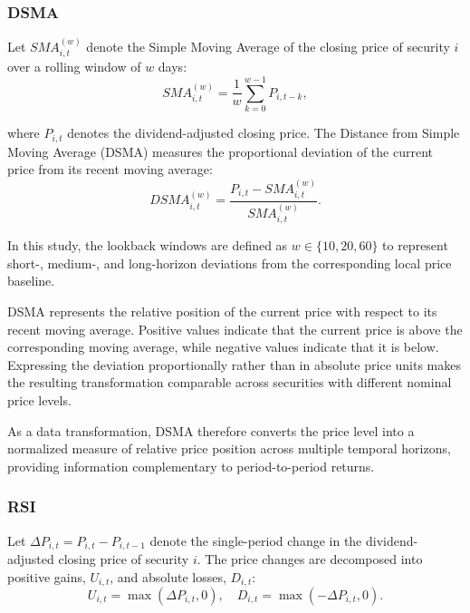 \subsubsection{\acf{DSMA}}
Let $SMA_{i,t}^{(w)}$ denote the Simple Moving Average of the closing price of security $i$ over a rolling window of $w$ days:
\begin{equation}
	SMA_{i,t}^{(w)} = \frac{1}{w}\sum_{k=0}^{w-1} P_{i,t-k},
\end{equation}

where $P_{i,t}$ denotes the dividend-adjusted closing price. The Distance from Simple Moving Average (DSMA) measures the proportional deviation of the current price from its recent moving average:
\begin{equation}
	DSMA_{i,t}^{(w)}=\frac{P_{i,t}-SMA_{i,t}^{(w)}}{SMA_{i,t}^{(w)}}.
\end{equation}

In this study, the lookback windows are defined as
$w\in\{10,20,60\}$ to represent short-, medium-, and long-horizon deviations from the corresponding local price baseline.

\medskip

\acs{DSMA} represents the relative position of the current price with respect to its recent moving average. Positive values indicate that the current price is above the corresponding moving average, while negative values indicate that it is below. Expressing the deviation proportionally rather than in absolute price units makes the resulting transformation comparable across securities with different nominal price levels.

\medskip

As a data transformation, \acs{DSMA} therefore converts the price level into a normalized measure of relative price position across multiple temporal horizons, providing information complementary to period-to-period returns.

\subsubsection{\acf{RSI}}
Let
$\Delta P_{i,t}=P_{i,t}-P_{i,t-1}$
denote the single-period change in the dividend-adjusted closing price of security $i$. The price changes are decomposed into positive gains, $U_{i,t}$, and absolute losses, $D_{i,t}$:
\begin{equation}
	U_{i,t}=\max(\Delta P_{i,t},0), \quad D_{i,t}=\max(-\Delta P_{i,t},0).
\end{equation}

